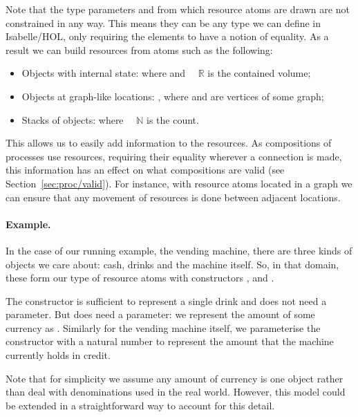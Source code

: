 \documentclass[class=smolathesis,crop=false]{standalone}
\begin{document}
Note that the type parameters  and  from which resource atoms are drawn are not constrained in any way.
This means they can be any type we can define in Isabelle/HOL, only requiring the elements to have a notion of equality.
As a result we can build resources from atoms such as the following:
\begin{itemize}
  \item Objects with internal state:  where  and {~\isasymin~$\mathbb{R}$} is the contained volume;
  \item Objects at graph-like locations: ,  where  and  are vertices of some graph;
  \item Stacks of objects:  where {~\isasymin~$\mathbb{N}$} is the count.
\end{itemize}

This allows us to easily add information to the resources.
As compositions of processes use resources, requiring their equality wherever a connection is made, this information has an effect on what compositions are valid (see Section~\ref{sec:proc/valid}).
For instance, with resource atoms located in a graph we can ensure that any movement of resources is done between adjacent locations.

\paragraph*{Example.}
In the case of our running example, the vending machine, there are three kinds of objects we care about: cash, drinks and the machine itself.
So, in that domain, these form our type of resource atoms with constructors ,  and .

The constructor  is sufficient to represent a single drink and does not need a parameter.
But  does need a parameter: we represent the amount  of some currency as .
Similarly for the vending machine itself, we parameterise the  constructor with a natural number to represent the amount that the machine currently holds in credit.

Note that for simplicity we assume any amount of currency is one object rather than deal with denominations used in the real world.
However, this model could be extended in a straightforward way to account for this detail.
\end{document}
